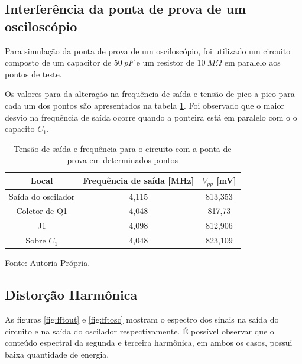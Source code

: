 \subsection{Interferência da ponta de prova de um osciloscópio}
Para simulação da ponta de prova de um osciloscópio, foi utilizado um circuito composto de um capacitor de $50 \ pF$ e um resistor de $10 \ M\Omega$ em paralelo aos pontos de teste.

Os valores para da alteração na frequência de saída e tensão de pico a pico para cada um dos pontos são apresentados na tabela \ref{tab:pontadeprova}. Foi observado que o maior desvio na frequência de saída ocorre quando a ponteira está em paralelo com o o capacito $C_1$.

\begin{table}[H]
    \begin{center}
        \caption{Tensão de saída e frequência para o circuito com a ponta de prova em determinados pontos}\label{tab:pontadeprova}
        \begin{tabular}{ccc}
            \hline
            Local & Frequência de saída [MHz] & $V_{pp}$ [mV]\\
            \hline
             Saída do oscilador& 4,115 & 813,353 \\
             Coletor de Q1 & 4,048 & 817,73\\
             J1 & 4,098 & 812,906\\
             Sobre $C_1$ & 4,048 & 823,109 \\
            \hline
        \end{tabular}
        
        \small Fonte: Autoria Própria.
    \end{center}
\end{table}

\subsection{Distorção Harmônica}

As figuras \ref{fig:fftout} e \ref{fig:fftosc} mostram o espectro dos sinais na saída do circuito e na saída do oscilador respectivamente. É possível observar que o conteúdo espectral da segunda e terceira harmônica, em ambos os casos, possui baixa quantidade de energia.

